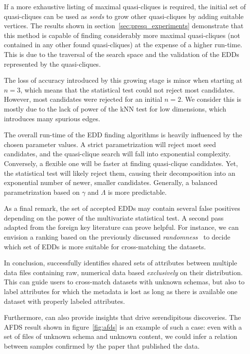 If a more exhaustive listing of maximal quasi-cliques is required, the initial set of
quasi-cliques can be used as \emph{seeds} to grow other quasi-cliques by adding suitable vertices.
The results shown in  section~\ref{sec:presq_experiments} demonstrate that this method is capable of
finding considerably more maximal quasi-cliques (not contained in any other found quasi-cliques)
at the expense of a higher run-time. This is due to the traversal of the search space and the
validation of the \glspl{EDD} represented by the quasi-cliques.

The loss of accuracy introduced by this growing stage is minor when starting at $n = 3$,
which means that the statistical test could not reject most candidates. However,
most candidates were rejected for an
initial $n = 2$. We consider this is mostly due
to the lack of power of the \gls{kNN} test for low dimensions, which introduces
many spurious edges.

The overall run-time of the \gls{EDD} finding algorithms is heavily influenced by the
chosen parameter values.
A strict parametrization will reject most seed candidates, and the quasi-clique search will fall
into exponential complexity. Conversely, a flexible one will be faster at finding
quasi-clique candidates. Yet, the statistical test will likely reject them, causing their decomposition
into an exponential number of newer, smaller candidates.
Generally, a balanced parametrization based on $\gamma$ and $\Lambda$ is more predictable.

As a final remark, the set of accepted \glspl{EDD} may contain several false positives depending on the power of
the multivariate statistical test. A second pass adapted from the foreign key literature can prove helpful.
For instance, we can envision a ranking based on the previously discussed \emph{randomness}~\cite{Zhang2010}
to decide which set of \glspl{EDD} is more suitable for cross-matching the datasets.

In conclusion, \PresQ successfully identifies shared sets of attributes
between multiple data files containing raw, numerical data based \emph{exclusively}
on their distribution. This can guide users to cross-match datasets with unknown schemas,
but also to label attributes for which the metadata is lost as long as there is available
one dataset with properly labeled attributes.

Furthermore, \PresQ can also provide insights that drive serendipitous discoveries.
The \gls{AFDS} result shown in figure~\ref{fig:afds} is an example of such a case:
even with a set of files of unknown schema and unknown content, we could infer
a relation between samples confirmed by the paper that published the data.

